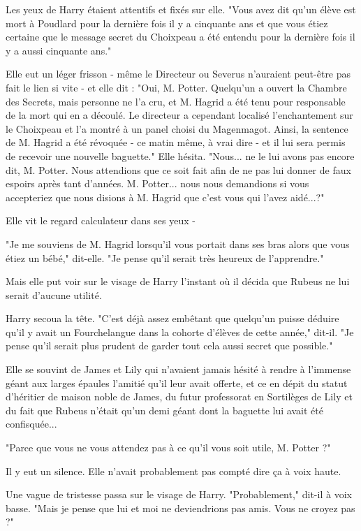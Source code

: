 Les yeux de Harry étaient attentifs et fixés sur elle. "Vous avez dit qu'un élève est mort à Poudlard pour la dernière fois il y a cinquante ans et que vous étiez certaine que le message secret du Choixpeau a été entendu pour la dernière fois il y a aussi cinquante ans."

Elle eut un léger frisson - même le Directeur ou Severus n'auraient peut-être pas fait le lien si vite - et elle dit : "Oui, M. Potter. Quelqu'un a ouvert la Chambre des Secrets, mais personne ne l'a cru, et M. Hagrid a été tenu pour responsable de la mort qui en a découlé. Le directeur a cependant localisé l'enchantement sur le Choixpeau et l'a montré à un panel choisi du Magenmagot. Ainsi, la sentence de M. Hagrid a été révoquée - ce matin même, à vrai dire - et il lui sera permis de recevoir une nouvelle baguette." Elle hésita. "Nous... ne le lui avons pas encore dit, M. Potter. Nous attendions que ce soit fait afin de ne pas lui donner de faux espoirs après tant d'années. M. Potter... nous nous demandions si vous accepteriez que nous disions à M. Hagrid que c'est vous qui l'avez aidé...?"

Elle vit le regard calculateur dans ses yeux -

"Je me souviens de M. Hagrid lorsqu'il vous portait dans ses bras alors que vous étiez un bébé," dit-elle. "Je pense qu'il serait très heureux de l'apprendre."

Mais elle put voir sur le visage de Harry l'instant où il décida que Rubeus ne lui serait d'aucune utilité.

Harry secoua la tête. "C'est déjà assez embêtant que quelqu'un puisse déduire qu'il y avait un Fourchelangue dans la cohorte d'élèves de cette année," dit-il. "Je pense qu'il serait plus prudent de garder tout cela aussi secret que possible."

Elle se souvint de James et Lily qui n'avaient jamais hésité à rendre à l'immense géant aux larges épaules l'amitié qu'il leur avait offerte, et ce en dépit du statut d'héritier de maison noble de James, du futur professorat en Sortilèges de Lily et du fait que Rubeus n'était qu'un demi géant dont la baguette lui avait été confisquée...

"Parce que vous ne vous attendez pas à ce qu'il vous soit utile, M. Potter ?"

Il y eut un silence. Elle n'avait probablement pas compté dire ça à voix haute.

Une vague de tristesse passa sur le visage de Harry. "Probablement," dit-il à voix basse. "Mais je pense que lui et moi ne deviendrions pas amis. Vous ne croyez pas ?"

